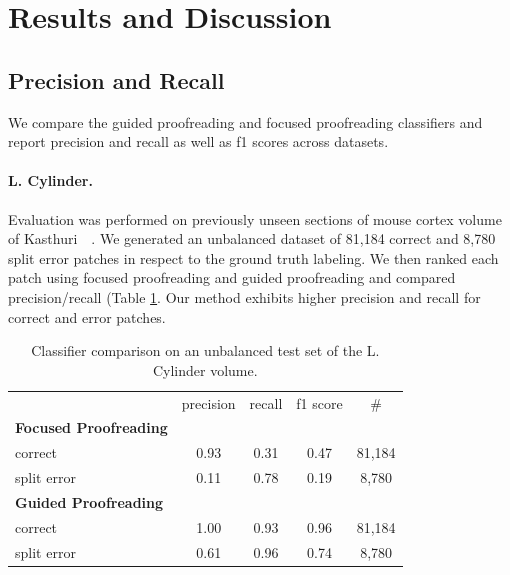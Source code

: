 



\section{Results and Discussion}


\subsection{Precision and Recall}

We compare the guided proofreading and focused proofreading classifiers and report precision and recall as well as f1 scores across datasets.

\paragraph{L. Cylinder.} Evaluation was performed on previously unseen sections of mouse cortex volume of Kasthuri~\etal~\cite{kasthuri2015saturated}. We generated an unbalanced dataset of 81,184 correct and 8,780 split error patches in respect to the ground truth labeling. We then ranked each patch using focused proofreading and guided proofreading and compared precision/recall (Table \ref{tab:prcyl}. Our method exhibits higher precision and recall for correct and error patches.

\begin{table}[h]
\caption{Classifier comparison on an unbalanced test set of the L. Cylinder volume.}%

\small{
\begin{tabular}{l|c|c|c|c}

 & precision & recall & f1 score & \# \\ 
\textbf{Focused Proofreading} & ~ & ~ & ~ & ~ \\ 
correct & 0.93 & 0.31 & 0.47 & 81,184 \\ 
split error & 0.11 & 0.78 & 0.19 & 8,780 \\ 
\textbf{Guided Proofreading} & ~ & ~ & ~ & ~ \\ 
correct & 1.00 & 0.93 & 0.96 & 81,184 \\ 
split error & 0.61 & 0.96 & 0.74 & 8,780 \\ 
\end{tabular} 
}
\label{tab:prcyl}
\end{table}

